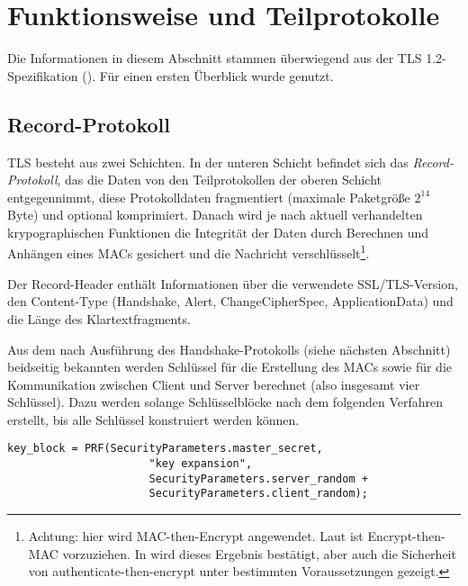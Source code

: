 
\chapter{Funktionsweise und Teilprotokolle}

Die Informationen in diesem Abschnitt stammen überwiegend aus der TLS 1.2-Spezifikation (\cite{tls12}). Für einen ersten Überblick wurde \cite{eckert13} genutzt.

\section{Record-Protokoll}

TLS besteht aus zwei Schichten. In der unteren Schicht befindet sich das \emph{Record-Protokoll}, das die Daten von den Teilprotokollen der oberen Schicht entgegennimmt, diese Protokolldaten fragmentiert (maximale Paketgröße \(2^{14}\) Byte) und optional komprimiert. Danach wird je nach aktuell verhandelten krypographischen Funktionen die Integrität der Daten durch Berechnen und Anhängen eines MACs gesichert und die Nachricht verschlüsselt\footnote{Achtung: hier wird MAC-then-Encrypt angewendet. Laut \cite{AE2000} ist Encrypt-then-MAC vorzuziehen. In \cite{krawczyk01} wird dieses Ergebnis bestätigt, aber auch die Sicherheit von authenticate-then-encrypt unter bestimmten Voraussetzungen gezeigt.}. 

Der Record-Header enthält Informationen über die verwendete SSL/TLS-Version, den Content-Type (Handshake, Alert, ChangeCipherSpec, ApplicationData) und die Länge des Klartextfragments.

Aus dem nach Ausführung des Handshake-Protokolls (siehe nächsten Abschnitt) beidseitig bekannten \mastersecret{} werden Schlüssel für die Erstellung des MACs sowie für die Kommunikation zwischen Client und Server berechnet (also insgesamt vier Schlüssel). Dazu werden solange Schlüsselblöcke nach dem folgenden Verfahren erstellt, bis alle Schlüssel konstruiert werden können. 

\begin{lstlisting}
key_block = PRF(SecurityParameters.master_secret,
                      "key expansion",
                      SecurityParameters.server_random +
                      SecurityParameters.client_random);
\end{lstlisting}

